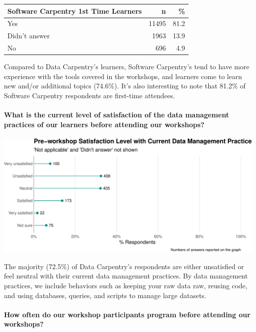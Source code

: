 \documentclass[]{article}
\let\oldparagraph\paragraph
\renewcommand{\paragraph}[1]{\oldparagraph{#1}\mbox{}}
\begin{document}
\begin{longtable}[]{@{}lrr@{}}
\toprule
Software Carpentry 1st Time Learners & n & \%\tabularnewline
\midrule
\endhead
Yes & 11495 & 81.2\tabularnewline
Didn't answer & 1963 & 13.9\tabularnewline
No & 696 & 4.9\tabularnewline
\bottomrule
\end{longtable}

Compared to Data Carpentry's learners, Software Carpentry's tend to have
more experience with the tools covered in the workshops, and learners
come to learn new and/or additional topics (74.6\%). It's also
interesting to note that 81.2\% of Software Carpentry respondents are
first-time attendees.

\paragraph{What is the current level of satisfaction of the data
management practices of our learners before attending our
workshops?}\label{what-is-the-current-level-of-satisfaction-of-the-data-management-practices-of-our-learners-before-attending-our-workshops}

\includegraphics[width=720]{figures/dc-satisfaction-level-plot-1}

The majority (72.5\%) of Data Carpentry's respondents are either
unsatisfied or feel neutral with their current data management
practices. By data management practices, we include behaviors such as
keeping your raw data raw, reusing code, and using databases, queries,
and scripts to manage large datasets.

\paragraph{How often do our workshop participants program before
attending our
workshops?}\label{how-often-do-our-workshop-participants-program-before-attending-our-workshops}
\end{document}
